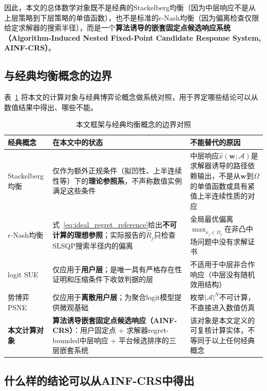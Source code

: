 \documentclass[UTF8,11pt]{ctexart}
\newcommand{\A}{\mathcal{A}}
\newcommand{\w}{\boldsymbol{w}}
\begin{document}
因此，本文的总体数学对象既不是经典的Stackelberg均衡（因为中层响应不是从上层策略到下层策略的单值函数），也不是标准的$\epsilon$-Nash均衡（因为偏离检查仅限给定求解器的搜索半径），而是一个\textbf{算法诱导的嵌套固定点候选响应系统（Algorithm-Induced Nested Fixed-Point Candidate Response System, AINF-CRS）}。

\subsection{与经典均衡概念的边界}

表~\ref{tab:framework_vs_classical} 将本文的计算对象与经典博弈论概念做系统对照，用于界定哪些结论可以从数值结果中得出、哪些不能。

\begin{table}[H]
\centering
\caption{本文框架与经典均衡概念的边界对照}
\label{tab:framework_vs_classical}
\small
\begin{tabular}{@{}>{\raggedright\arraybackslash}p{}>{\raggedright\arraybackslash}p{}>{\raggedright\arraybackslash}p{}@{}}
\toprule
经典概念 & 在本文中的状态 & 不能替代的原因 \\
\midrule
Stackelberg均衡 & 仅作为额外正规条件（拟凹性、上半连续性等）下的\textbf{理论参照系}，不声称数值实例满足这些条件 & 中层响应$\widehat x(\w;\mathcal{A})$是求解器诱导的路径依赖输出，不是从$\w$到$\Omega$的单值函数或具有紧值上半连续性质的对应 \\
\midrule
$\epsilon$-Nash均衡 & 式~\eqref{eq:ideal_regret_reference}给出\textbf{不可计算的理想参照}；实际报告的$\widehat R_j$只检查SLSQP搜索半径内的偏离 & 全局最优偏离$\max_{\tilde x_j\in\Omega_j}$在非凸中场问题中没有求解证书 \\
\midrule
logit SUE & 仅应用于\textbf{用户层}；是唯一具有严格存在性证明和压缩条件下收敛判据的层 & 不适用于中层非合作响应（中层没有随机效用结构） \\
\midrule
势博弈PSNE & 仅应用于\textbf{离散用户层}；为聚合logit模型提供微观基础 & 枚举$|\A|^N$不可计算，不直接进入数值仿真 \\
\midrule
\textbf{本文计算对象} & \textbf{算法诱导嵌套固定点候选响应（AINF-CRS）}：用户固定点 + 求解器regret-bounded中层响应 + 平台候选排序的三层嵌套系统 & 该对象是本文定义的可复核计算实体，不等同于以上任何经典概念 \\
\bottomrule
\end{tabular}
\end{table}

\subsection{什么样的结论可以从AINF-CRS中得出}
\end{document}
